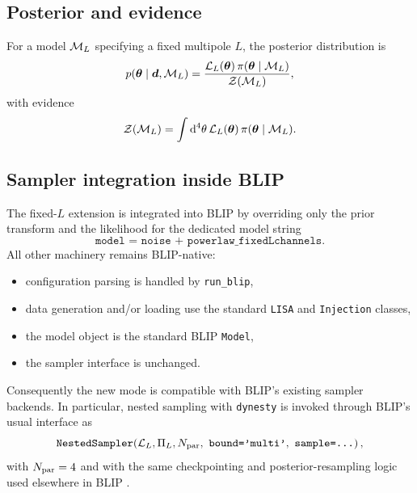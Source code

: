 \documentclass[11pt]{article}
\newcommand{\vect}[1]{\bm{#1}}
\newcommand{\dd}{\mathrm{d}}
\begin{document}
\subsection{Posterior and evidence}

For a model ${\cal M}_L$ specifying a fixed multipole $L$, the posterior distribution is
\begin{equation}
  p(\vect{\theta}\mid \vect{d},{\cal M}_L)
  =
  \frac{
    \mathcal{L}_L(\vect{\theta})\,
    \pi(\vect{\theta}\mid {\cal M}_L)
  }{
    {\cal Z}({\cal M}_L)
  },
  \label{eq:posterior}
\end{equation}
with evidence
\begin{equation}
  {\cal Z}({\cal M}_L)
  =
  \int \dd^4\theta\,
  \mathcal{L}_L(\vect{\theta})\,
  \pi(\vect{\theta}\mid {\cal M}_L).
\end{equation}

\subsection{Sampler integration inside BLIP}

The fixed-$L$ extension is integrated into BLIP by overriding only the prior transform and the likelihood for the dedicated model string
\begin{equation}
  \texttt{model = noise + powerlaw\_fixedLchannels}.
\end{equation}
All other machinery remains BLIP-native:
\begin{itemize}[leftmargin=2em]
  \item configuration parsing is handled by \texttt{run\_blip},
  \item data generation and/or loading use the standard \texttt{LISA} and \texttt{Injection} classes,
  \item the model object is the standard BLIP \texttt{Model},
  \item the sampler interface is unchanged.
\end{itemize}
Consequently the new mode is compatible with BLIP's existing sampler backends.  In particular, nested sampling with \texttt{dynesty} is invoked through BLIP's usual interface as
\begin{equation}
  \texttt{NestedSampler}\!\left(\mathcal{L}_L,\Pi_L,N_{\rm par},\ \texttt{bound='multi'},\ \texttt{sample=...}\right),
\end{equation}
with $N_{\rm par}=4$ and with the same checkpointing and posterior-resampling logic used elsewhere in BLIP \cite{SpeagleDynesty}.
\end{document}
